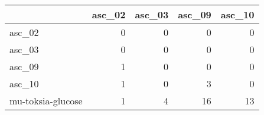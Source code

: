 \begin{tabular}{lrrrr}
\toprule
{} &  asc\_02 &  asc\_03 &  asc\_09 &  asc\_10 \\
\midrule
asc\_02            &       0 &       0 &       0 &       0 \\
asc\_03            &       0 &       0 &       0 &       0 \\
asc\_09            &       1 &       0 &       0 &       0 \\
asc\_10            &       1 &       0 &       3 &       0 \\
mu-toksia-glucose &       1 &       4 &      16 &      13 \\
\bottomrule
\end{tabular}
